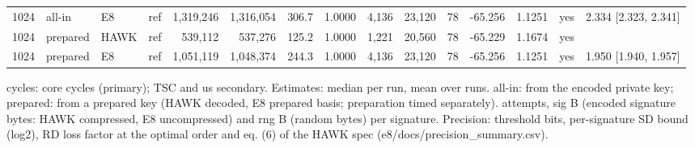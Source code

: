 \begin{table}[t]
{\begin{tabular}{rllcrrrrrrrrrcl}
1024 & all-in & E8 & ref & 1{,}319{,}246 & 1{,}316{,}054 & 306.7 & 1.0000 & 4{,}136 & 23{,}120 & 78 & -65.256 & 1.1251 & yes & 2.334 [2.323, 2.341] \\
1024 & prepared & HAWK & ref & 539{,}112 & 537{,}276 & 125.2 & 1.0000 & 1{,}221 & 20{,}560 & 78 & -65.229 & 1.1674 & yes &  \\
1024 & prepared & E8 & ref & 1{,}051{,}119 & 1{,}048{,}374 & 244.3 & 1.0000 & 4{,}136 & 23{,}120 & 78 & -65.256 & 1.1251 & yes & 1.950 [1.940, 1.957] \\
\bottomrule
\end{tabular}}
\par\smallskip\parbox{\linewidth}{\scriptsize cycles: core cycles (primary); TSC and us secondary. Estimates: median per run, mean over runs. all-in: from the encoded private key; prepared: from a prepared key (HAWK decoded, E8 prepared basis; preparation timed separately). attempts, sig B (encoded signature bytes: HAWK compressed, E8 uncompressed) and rng B (random bytes) per signature. Precision: threshold bits, per-signature SD bound (log2), RD loss factor at the optimal order and eq. (6) of the HAWK spec (e8/docs/precision\_summary.csv).}
\end{table}

